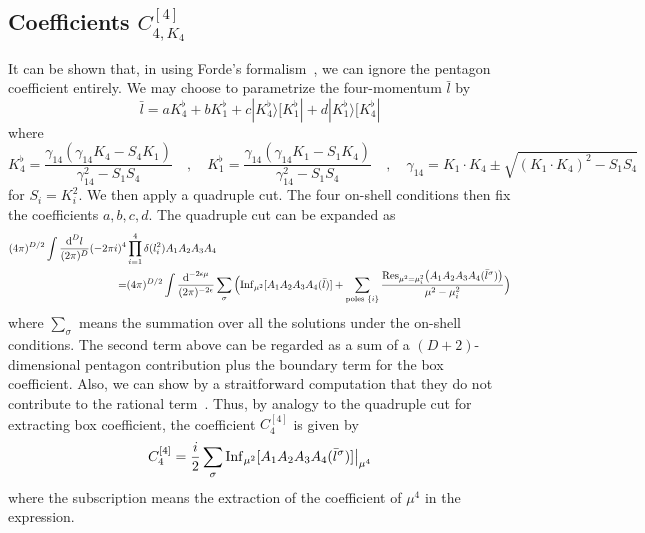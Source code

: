 \subsection{Coefficients $C_{4, K_4}^{[4]}$}
It can be shown that, in using Forde's formalism~\cite{Forde:2007mi}, we can ignore the pentagon coefficient entirely.
We may choose to parametrize the four-momentum $\bar{l}$ by
\begin{equation}
\bar{l} = a K_4^\flat + bK_1^\flat + c|K_4^\flat\rangle [K_1^\flat| + d|K_1^\flat\rangle[K_4^\flat|
\end{equation}
where
\begin{equation}\label{param_rat_box}
K_4^\flat = \frac{\gamma_{14}(\gamma_{14}K_4 - S_4K_1)}{\gamma_{14}^2 - S_1S_4}
\quad,\quad
K_1^\flat = \frac{\gamma_{14}(\gamma_{14}K_1 - S_1K_4)}{\gamma_{14}^2 - S_1S_4}
\quad,\quad
\gamma_{14} = K_1\cdot K_4\pm\sqrt{(K_1\cdot K_4)^2 - S_1 S_4}
\end{equation}
for $S_i = K_i^2$.
We then apply a quadruple cut.
The four on-shell conditions then fix the coefficients $a,b,c,d$.
The quadruple cut can be expanded as
\begin{equation}
\begin{split}
(4\pi)^{D/2}\int\frac{\textrm{d}^D l}{(2\pi)^D}(-2\pi i)^4 & \prod^4_{i=1}\delta(l_i^2)A_1A_2A_3A_4
\\
= & (4\pi)^{D/2}\int\frac{\textrm{d}^{-2\epsilon \mu}}{(2\pi)^{-2\epsilon}}
\sum_{\sigma}\Big(\mathrm{Inf}_{\mu^2}[A_1 A_2 A_3 A_4(\bar{l})] 
+ \sum_{\textrm{poles $\{i\}$}}\frac{\mathrm{Res}_{\mu^2 = \mu_i^2}\big(A_1A_2A_3A_4(\bar{l}^\sigma)\big)}{\mu^2 - \mu_i^2}\Big)
\end{split}
\end{equation}
where $\sum_\sigma$ means the summation over all the solutions under the on-shell conditions. 
The second term above can be regarded as a sum of a $(D + 2)$-dimensional pentagon contribution plus the boundary term for the box coefficient.
Also, we can show by a straitforward computation that they do not contribute to the rational term~\cite{Badger:2008cm}. 
Thus, by analogy to the quadruple cut for extracting box coefficient, the coefficient $C_4^{[4]}$ is given by
\begin{equation}
C_4^{[4]} = \frac{i}{2}\sum_{\sigma}\mathrm{Inf}_{\mu^2}[A_1A_2A_3A_4(\bar{l}^\sigma)]\big|_{\mu^4}
\end{equation}
where the subscription means the extraction of the coefficient of $\mu^4$ in the expression.
%
%
